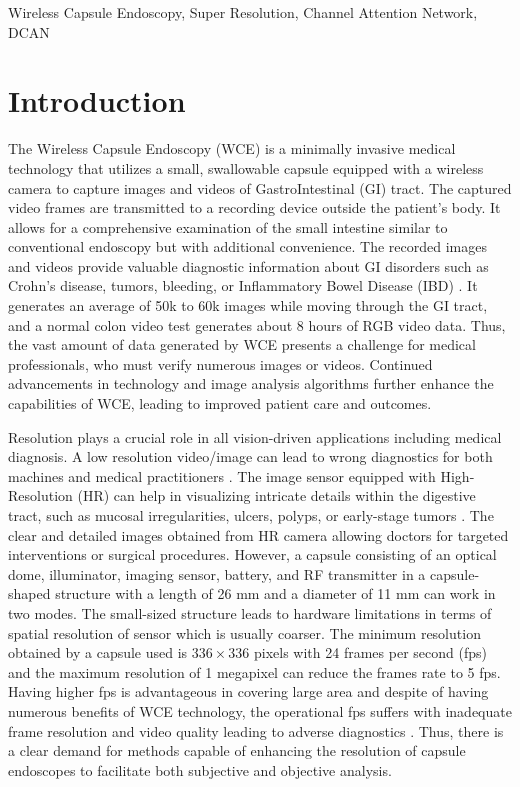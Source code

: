 \documentclass[conference]{IEEEtran}
\begin{document}
\begin{IEEEkeywords}
Wireless Capsule Endoscopy, Super Resolution, Channel Attention Network, DCAN
\end{IEEEkeywords}

\section{Introduction}
The Wireless Capsule Endoscopy (WCE) is a minimally invasive medical technology that utilizes a small, swallowable capsule equipped with a wireless camera to capture images and videos of GastroIntestinal (GI) tract. The captured video frames are transmitted to a recording device outside the patient's body. It allows for a comprehensive examination of the small intestine similar to conventional endoscopy but with additional convenience. The recorded images and videos provide valuable diagnostic information about GI disorders such as Crohn's disease, tumors, bleeding, or Inflammatory Bowel Disease (IBD) \cite{WCE}. It generates an average of 50k to 60k images while moving through the GI tract, and a normal colon video test generates about 8 hours of RGB video data. Thus, the vast amount of data generated by WCE presents a challenge for medical professionals, who must verify numerous images or videos. Continued advancements in technology and image analysis algorithms further enhance the capabilities of WCE, leading to improved patient care and outcomes.


Resolution plays a crucial role in all vision-driven applications including medical diagnosis. A low resolution video/image can lead to wrong diagnostics for both machines and medical practitioners \cite{WCE2}. The image sensor equipped with High-Resolution (HR) can help in visualizing intricate details within the digestive tract, such as mucosal irregularities, ulcers, polyps, or early-stage tumors \cite{WCE3}. The clear and detailed images obtained from HR camera allowing doctors for targeted interventions or surgical procedures. However, a capsule consisting of an optical dome, illuminator, imaging sensor, battery, and RF transmitter in a capsule-shaped structure with a length of 26 mm and a diameter of 11 mm \cite{WCE} can work in two modes. The small-sized structure leads to hardware limitations in terms of spatial resolution of sensor which is usually coarser. The minimum resolution obtained by a capsule used is $336 \times 336$ pixels with 24 frames per second (fps) \cite{data} and the maximum resolution of 1 megapixel can reduce the frames rate to 5 fps. Having higher fps is advantageous in covering large area and despite of having numerous benefits of WCE technology, the operational fps suffers with inadequate frame resolution and video quality leading to adverse diagnostics \cite{lowres}. Thus, there is a clear demand for methods capable of enhancing the resolution of capsule endoscopes to facilitate both subjective and objective analysis.
\end{document}
